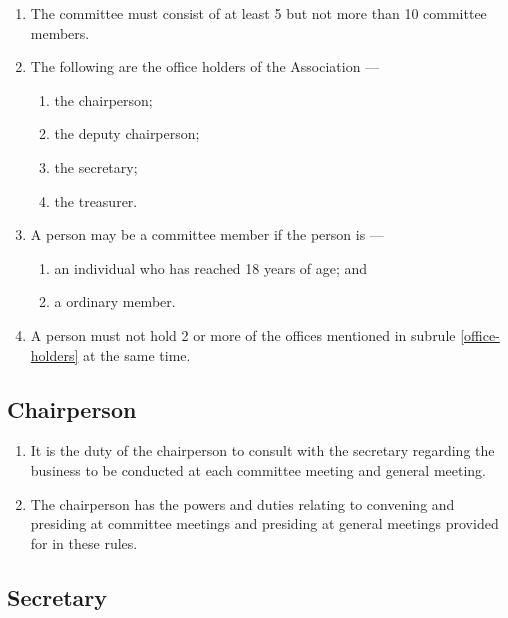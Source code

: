 \documentclass[../constitution.tex]{subfiles}
\begin{document}
\begin{enumerate}

  \item \label{number-of-committee-members} The committee must consist of at least 5 but not more than 10 committee members.
  \item \label{office-holders} The following are the office holders of the Association ---

        \begin{enumerate}

          \item the chairperson;
          \item the deputy chairperson;
          \item the secretary;
          \item the treasurer.
        \end{enumerate}
  \item A person may be a committee member if the person is --- \label{committee-eligibility}

        \begin{enumerate}

          \item an individual who has reached 18 years of age; and
          \item a ordinary member.
        \end{enumerate}
  \item A person must not hold 2 or more of the offices mentioned in subrule \ref{office-holders} at the same time.
\end{enumerate}

\hypertarget{chairperson}{%
  \subsection{Chairperson}\label{chairperson}}

\begin{enumerate}

  \item It is the duty of the chairperson to consult with the secretary regarding the business to be conducted at each committee meeting and general meeting.
  \item The chairperson has the powers and duties relating to convening and presiding at committee meetings and presiding at general meetings provided for in these rules.
\end{enumerate}

\hypertarget{secretary}{%
  \subsection{Secretary}\label{secretary}}
\end{document}
